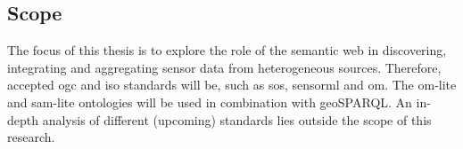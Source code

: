 \subsection{Scope}
The focus of this thesis is to explore the role of the semantic web in discovering, integrating and aggregating sensor data from heterogeneous sources. Therefore, accepted \ac{ogc} and \ac{iso} standards will be, such as \ac{sos}, \ac{sensorml} and \ac{om}. The om-lite and sam-lite ontologies will be used in combination with geoSPARQL. An in-depth analysis of different (upcoming) standards lies outside the scope of this research. 